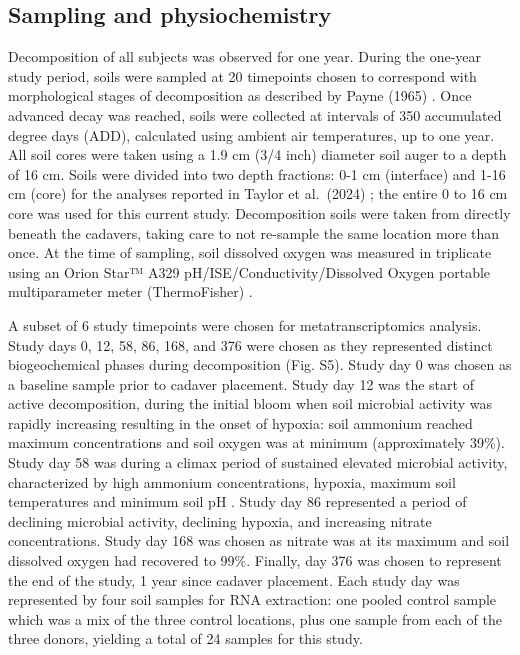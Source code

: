 \documentclass[
  sn-nature,
  lineno, referee]{sn-jnl}
\begin{document}
\subsection{Sampling and
physiochemistry}\label{sampling-and-physiochemistry}

Decomposition of all subjects was observed for one year. During the
one-year study period, soils were sampled at 20 timepoints chosen to
correspond with morphological stages of decomposition as described by
Payne (1965) \citep{payne_summer_1965}. Once advanced decay was reached,
soils were collected at intervals of 350 accumulated degree days (ADD),
calculated using ambient air temperatures, up to one year. All soil
cores were taken using a 1.9 cm (3/4 inch) diameter soil auger to a
depth of 16 cm. Soils were divided into two depth fractions: 0-1 cm
(interface) and 1-16 cm (core) for the analyses reported in Taylor et
al.~(2024) \citep{taylor_transient_2024}; the entire 0 to 16 cm core was
used for this current study. Decomposition soils were taken from
directly beneath the cadavers, taking care to not re-sample the same
location more than once. At the time of sampling, soil dissolved oxygen
was measured in triplicate using an Orion Star™ A329
pH/ISE/Conductivity/Dissolved Oxygen portable multiparameter meter
(ThermoFisher) \citep{taylor_transient_2024}.

A subset of 6 study timepoints were chosen for metatranscriptomics
analysis. Study days 0, 12, 58, 86, 168, and 376 were chosen as they
represented distinct biogeochemical phases during decomposition (Fig.
S5). Study day 0 was chosen as a baseline sample prior to cadaver
placement. Study day 12 was the start of active decomposition, during
the initial bloom when soil microbial activity was rapidly increasing
resulting in the onset of hypoxia: soil ammonium reached maximum
concentrations and soil oxygen was at minimum (approximately 39\%).
Study day 58 was during a climax period of sustained elevated microbial
activity, characterized by high ammonium concentrations, hypoxia,
maximum soil temperatures and minimum soil pH
\citep{taylor_transient_2024}. Study day 86 represented a period of
declining microbial activity, declining hypoxia, and increasing nitrate
concentrations. Study day 168 was chosen as nitrate was at its maximum
and soil dissolved oxygen had recovered to 99\%. Finally, day 376 was
chosen to represent the end of the study, 1 year since cadaver
placement. Each study day was represented by four soil samples for RNA
extraction: one pooled control sample which was a mix of the three
control locations, plus one sample from each of the three donors,
yielding a total of 24 samples for this study.
\end{document}
